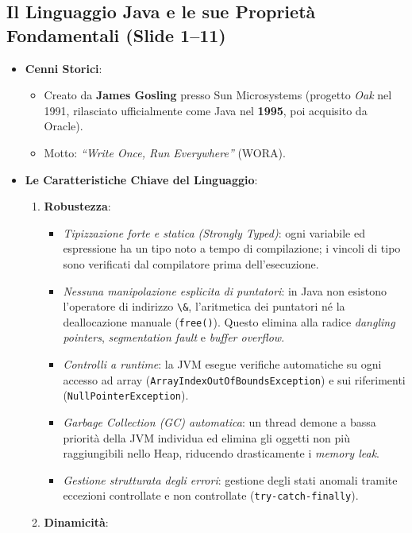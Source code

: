 \documentclass[11pt,a4paper,oneside]{report}
\newcommand{\passthrough}[1]{#1}
\providecommand{\tightlist}{\setlength{\itemsep}{0pt}\setlength{\parskip}{0pt}}
\begin{document}
\subsection{Il Linguaggio Java e le sue Proprietà Fondamentali (Slide
1--11)}\label{chap03_il-linguaggio-java-e-le-sue-proprietuxe0-fondamentali-slide-111}

\begin{itemize}
\tightlist
\item
  \textbf{Cenni Storici}:

  \begin{itemize}
  \tightlist
  \item
    Creato da \textbf{James Gosling} presso Sun Microsystems (progetto
    \emph{Oak} nel 1991, rilasciato ufficialmente come Java nel
    \textbf{1995}, poi acquisito da Oracle).
  \item
    Motto: \emph{``Write Once, Run Everywhere''} (WORA).
  \end{itemize}
\item
  \textbf{Le Caratteristiche Chiave del Linguaggio}:

  \begin{enumerate}
  \def\labelenumi{\arabic{enumi}.}
  \tightlist
  \item
    \textbf{Robustezza}:

    \begin{itemize}
    \tightlist
    \item
      \emph{Tipizzazione forte e statica (Strongly Typed)}: ogni
      variabile ed espressione ha un tipo noto a tempo di compilazione;
      i vincoli di tipo sono verificati dal compilatore prima
      dell'esecuzione.
    \item
      \emph{Nessuna manipolazione esplicita di puntatori}: in Java non
      esistono l'operatore di indirizzo \passthrough{\lstinline!\&!},
      l'aritmetica dei puntatori né la deallocazione manuale
      (\passthrough{\lstinline!free()!}). Questo elimina alla radice
      \emph{dangling pointers}, \emph{segmentation fault} e \emph{buffer
      overflow}.
    \item
      \emph{Controlli a runtime}: la JVM esegue verifiche automatiche su
      ogni accesso ad array
      (\passthrough{\lstinline!ArrayIndexOutOfBoundsException!}) e sui
      riferimenti (\passthrough{\lstinline!NullPointerException!}).
    \item
      \emph{Garbage Collection (GC) automatica}: un thread demone a
      bassa priorità della JVM individua ed elimina gli oggetti non più
      raggiungibili nello Heap, riducendo drasticamente i \emph{memory
      leak}.
    \item
      \emph{Gestione strutturata degli errori}: gestione degli stati
      anomali tramite eccezioni controllate e non controllate
      (\passthrough{\lstinline!try-catch-finally!}).
    \end{itemize}
  \item
    \textbf{Dinamicità}:


\end{enumerate}
\end{itemize}
\end{document}
